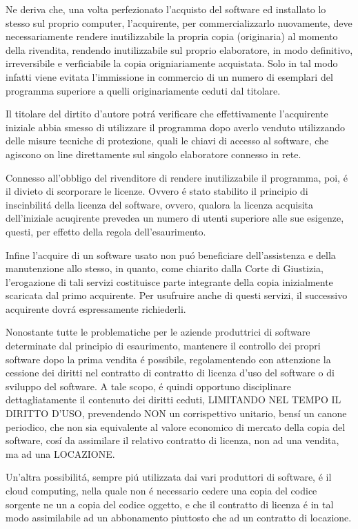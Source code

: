 \documentclass{article}
\begin{document}
Ne deriva che, una volta perfezionato l'acquisto del software ed installato lo stesso sul proprio computer, l'acquirente, per commercializzarlo nuovamente, deve necessariamente rendere inutilizzabile la propria copia (originaria) al momento della rivendita, rendendo inutilizzabile sul proprio elaboratore, in modo definitivo, irreversibile e verficiabile la copia origniariamente acquistata. Solo in tal modo infatti viene evitata l'immissione in commercio di un numero di esemplari del programma superiore a quelli originariamente ceduti dal titolare. 

Il titolare del dirtito d'autore potr\'a verificare che effettivamente l'acquirente iniziale abbia smesso di utilizzare il programma dopo averlo venduto utilizzando delle misure tecniche di protezione, quali le chiavi di accesso al software, che agiscono on line direttamente sul singolo elaboratore connesso in rete.

Connesso all'obbligo del rivenditore di rendere inutilizzabile il programma, poi, \'e il divieto di scorporare le licenze. Ovvero \'e stato stabilito il principio di inscinbilit\'a della licenza del software, ovvero, qualora la licenza acquisita dell'iniziale acuqirente prevedea un numero di utenti superiore alle sue esigenze, questi, per effetto della regola dell'esaurimento.

Infine l'acquire di un software usato non pu\'o beneficiare dell'assistenza e della manutenzione allo stesso, in quanto, come chiarito dalla Corte di Giustizia, l'erogazione di tali servizi costituisce parte integrante della copia inizialmente scaricata dal primo acquirente. Per usufruire anche di questi servizi, il successivo acquirente dovr\'a espressamente richiederli. 

Nonostante tutte le problematiche per le aziende produttrici di software determinate dal principio di esaurimento, mantenere il controllo dei propri software dopo la prima vendita \'e possibile, regolamentendo con attenzione la cessione dei diritti nel contratto di contratto di licenza d'uso del software o di sviluppo del software. A tale scopo, \'e quindi opportuno disciplinare dettagliatamente il contenuto dei diritti ceduti, LIMITANDO NEL TEMPO IL DIRITTO D'USO, prevendendo NON un corrispettivo unitario, bens\'i un canone periodico, che non sia equivalente al valore economico di mercato della copia del software, cos\'i da assimilare il relativo contratto di licenza, non ad una vendita, ma ad una LOCAZIONE. 

Un'altra possibilit\'a, sempre pi\'u utilizzata dai vari produttori di software, \'e il cloud computing, nella quale non \'e necessario cedere una copia del codice sorgente ne un a copia del codice oggetto, e che il contratto di licenza \'e in tal modo assimilabile ad un abbonamento piuttosto che ad un contratto di locazione. 
\end{document}
